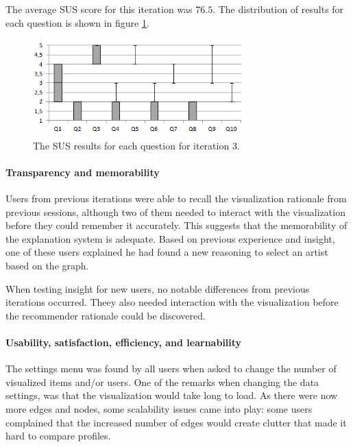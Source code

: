 The average SUS score for this iteration was $76.5$. The distribution of results for each question is shown in figure \ref{fig:iterations_sus_scores_it3_boxplots}.

\begin{figure}
	\begin{center}
		\includegraphics[width=8.3cm]{img/iterations_sus_scores_it3_boxplots}
	\end{center}
	\caption{The SUS results for each question for iteration 3.}
	\label{fig:iterations_sus_scores_it3_boxplots}
\end{figure}


\paragraph{Transparency and memorability}

Users from previous iterations were able to recall the visualization rationale from previous sessions, although two of them needed to interact with the visualization before they could remember it accurately. This suggests that the memorability of the explanation system is adequate. Based on previous experience and insight, one of these users explained he had found a new reasoning to select an artist based on the graph.

When testing insight for new users, no notable differences from previous iterations occurred. Theey also needed interaction with the visualization before the recommender rationale could be discovered.


\paragraph{Usability, satisfaction, efficiency, and learnability}

The settings menu was found by all users when asked to change the number of visualized items and/or users. One of the remarks when changing the data settings, was that the visualization would take long to load. As there were now more edges and nodes, some scalability issues came into play: some users complained that the increased number of edges would create clutter that made it hard to compare profiles.

